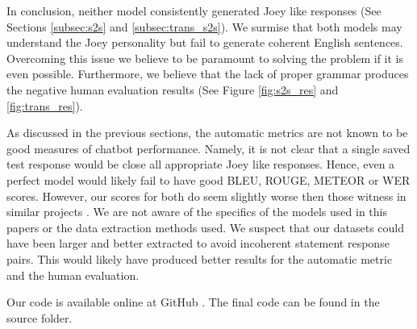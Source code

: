 \label{sec:conclusion}
In conclusion, neither model consistently generated Joey like responses (See Sections \ref{subsec:s2s} and \ref{subsec:trans_s2s}). 
We surmise that both models may understand the Joey personality but fail to generate coherent English sentences.
Overcoming this issue we believe to be paramount to solving the problem if it is even possible.
Furthermore, we believe that the lack of proper grammar produces the negative human evaluation results (See Figure \ref{fig:s2s_res} and \ref{fig:trans_res}).

As discussed in the previous sections, the automatic metrics are not known to be good measures of chatbot performance.
Namely, it is not clear that a single saved test response would be close all appropriate Joey like responses. 
Hence, even a perfect model would likely fail to have good BLEU, ROUGE, METEOR or WER scores.
However, our scores for both do seem slightly worse then those witness in similar projects \cite{NMC2017, Li2016}.
We are not aware of the specifics of the models used in this papers or the data extraction methods used.
We suspect that our datasets could have been larger and better extracted to avoid incoherent statement response pairs.
This would likely have produced better results for the automatic metric and the human evaluation.

Our code is available online at GitHub \cite{githubcode}.
The final code can be found in the source folder.
